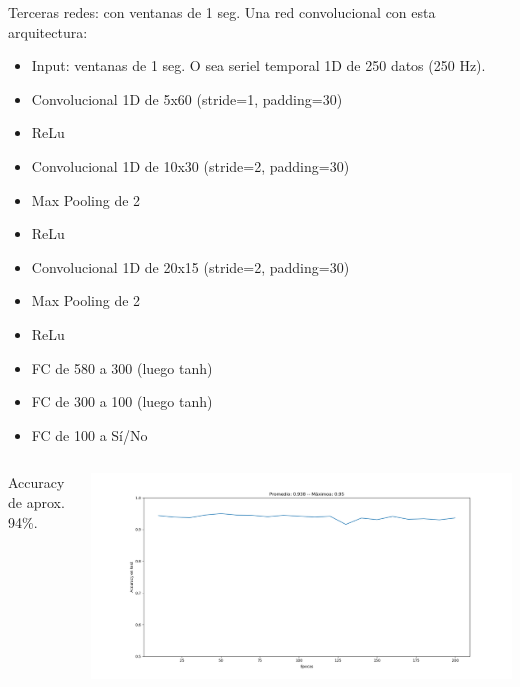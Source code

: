 \documentclass[presentation,9pt]{beamer}
\begin{document}
\begin{frame}{Terceras redes: con ventanas de 1 seg.}
	Una red convolucional con esta arquitectura:
	\begin{itemize}
		\item Input: ventanas de 1 seg. O sea seriel temporal 1D de 250 datos (250 Hz).
		\item Convolucional 1D de 5x60 (stride=1, padding=30)
		\item ReLu
		\item Convolucional 1D de 10x30 (stride=2, padding=30)
		\item Max Pooling de 2
		\item ReLu 
		\item Convolucional 1D de 20x15 (stride=2, padding=30)
		\item Max Pooling de 2
		\item ReLu
		\item FC de 580 a 300 (luego tanh)
		\item FC de 300 a 100 (luego tanh)
		\item FC de 100 a Sí/No
	\end{itemize}
	
		\begin{columns}
		Accuracy de aprox. 94\%.
		
		\includegraphics[width=.9\textwidth]{./cnn_v7_1seg_b1000.png}
		
	\end{columns}
	
\end{frame}
\end{document}
